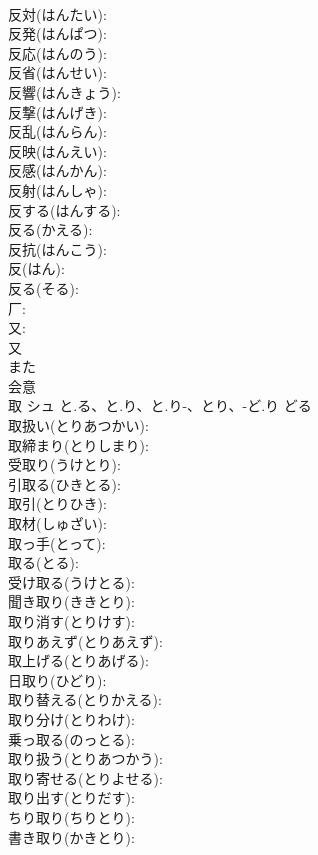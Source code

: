 \documentclass[8pt]{extreport}
\begin{document}
\begin{CJK}{UTF8}{min}
\\	反対(はんたい): 
\\	反発(はんぱつ): 
\\	反応(はんのう): 
\\	反省(はんせい): 
\\	反響(はんきょう): 
\\	反撃(はんげき): 
\\	反乱(はんらん): 
\\	反映(はんえい): 
\\	反感(はんかん): 
\\	反射(はんしゃ): 
\\	反する(はんする): 
\\	反る(かえる): 
\\	反抗(はんこう): 
\\	反(はん): 
\\	反る(そる): 
\\	厂: 
\\	又: 
\\	又	
\\	また	
\\	会意 
\\	取	シュ	と.る、と.り、と.り-、とり、-ど.り	どる	
\\	取扱い(とりあつかい): 
\\	取締まり(とりしまり): 
\\	受取り(うけとり): 
\\	引取る(ひきとる): 
\\	取引(とりひき): 
\\	取材(しゅざい): 
\\	取っ手(とって): 
\\	取る(とる): 
\\	受け取る(うけとる): 
\\	聞き取り(ききとり): 
\\	取り消す(とりけす): 
\\	取りあえず(とりあえず): 
\\	取上げる(とりあげる): 
\\	日取り(ひどり): 
\\	取り替える(とりかえる): 
\\	取り分け(とりわけ): 
\\	乗っ取る(のっとる): 
\\	取り扱う(とりあつかう): 
\\	取り寄せる(とりよせる): 
\\	取り出す(とりだす): 
\\	ちり取り(ちりとり): 
\\	書き取り(かきとり): 

\end{CJK}
\end{document}
